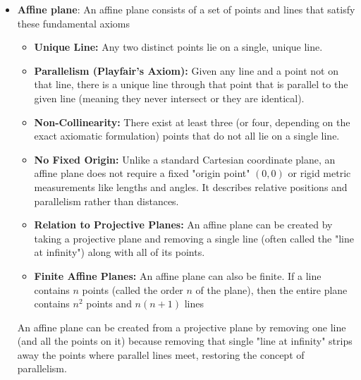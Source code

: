 \documentclass{report}
\begin{document}
\begin{itemize}
            \bigbreak \noindent 
            By identifying a special line as the "line at infinity" we are able to define parallelism of straight lines in the plane. However, certain other concepts make sense as well, as soon as we can define parallelism. For instance, we may define equalities of intervals between two points on parallel lines. For instance, if $A, B, C$ and $D$ are points, and the lines $AB$ and $CD$ are parallel, then we define the two intervals $AB$ and $CD$ to have equal length if the lines $AC$ and $BD$ are also parallel. Similarly, two intervals on the same line are equal if there exists another interval on a parallel line that is equal to both.
        \item \textbf{Affine plane}: An affine plane consists of a set of points and lines that satisfy these fundamental axioms
            \begin{itemize}
                \item \textbf{Unique Line:} Any two distinct points lie on a single, unique line.
                \item \textbf{Parallelism (Playfair’s Axiom):} Given any line and a point not on that line, there is a unique line through that point that is parallel to the given line (meaning they never intersect or they are identical).
                \item \textbf{Non-Collinearity:} There exist at least three (or four, depending on the exact axiomatic formulation) points that do not all lie on a single line.
            \end{itemize}
            \begin{itemize}
                \item \textbf{No Fixed Origin:} Unlike a standard Cartesian coordinate plane, an affine plane does not require a fixed "origin point" $(0,0)$ or rigid metric measurements like lengths and angles. It describes relative positions and parallelism rather than distances.
                \item \textbf{Relation to Projective Planes:} An affine plane can be created by taking a projective plane and removing a single line (often called the "line at infinity") along with all of its points.
                \item \textbf{Finite Affine Planes:} An affine plane can also be finite. If a line contains $n$ points (called the order $n$ of the plane), then the entire plane contains $n^{2}$ points and $n(n+1)$ lines
            \end{itemize}
            An affine plane can be created from a projective plane by removing one line (and all the points on it) because removing that single "line at infinity" strips away the points where parallel lines meet, restoring the concept of parallelism.

\end{itemize}
\end{document}
